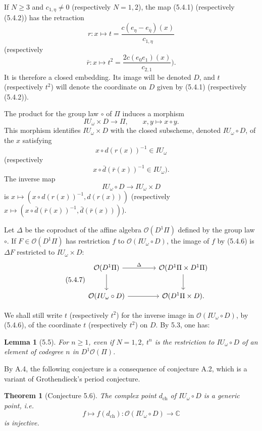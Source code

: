 \documentclass[10pt,a4paper]{article}
\newcommand{\OO}{\mathcal O}
\newcommand{\C}{\mathbb C}
\theoremstyle{deligne}
\newtheorem*{theorem*}{Theorem}
\newtheorem*{lemma*}{Lemma}
\begin{document}
If \(N\ge3\) and \(c_{1,\eta}\ne0\) (respectively \(N=1,2\)), the map (5.4.1) (respectively (5.4.2)) has the retraction
\[
r:x\longmapsto t=\frac{c(e_\eta-e_{\bar\eta})(x)}{c_{1,\eta}}
\]
(respectively
\[
\tag{5.4.3}
\bar r:x\longmapsto t^2=\frac{2c(e_0e_1)(x)}{c_{2,1}}).
\]
It is therefore a closed embedding. Its image will be denoted \(D\), and \(t\) (respectively \(t^2\)) will denote the coordinate on \(D\) given by (5.4.1) (respectively (5.4.2)).

The product for the group law \(\circ\) of \(\Pi\) induces a morphism
\[
\tag{5.4.4}
IU_\omega\times D\longrightarrow\Pi,\qquad x,y\longmapsto x\circ y.
\]
This morphism identifies \(IU_\omega\times D\) with the closed subscheme, denoted \(IU_\omega\circ D\), of the \(x\) satisfying
\[
x\circ d(r(x))^{-1}\in IU_\omega
\]
(respectively
\[
\tag{5.4.5}
x\circ\bar d(\bar r(x))^{-1}\in IU_\omega).
\]
The inverse map
\[
\tag{5.4.6}
IU_\omega\circ D\longrightarrow IU_\omega\times D
\]
is \(x\mapsto(x\circ d(r(x))^{-1},d(r(x)))\) (respectively \(x\mapsto(x\circ\bar d(\bar r(x))^{-1},\bar d(\bar r(x)))\)).

Let \(\Delta\) be the coproduct of the affine algebra \(\OO(D^1\Pi)\) defined by the group law \(\circ\). If \(F\in\OO(D^1\Pi)\) has restriction \(f\) to \(\OO(IU_\omega\circ D)\), the image of \(f\) by (5.4.6) is \(\Delta F\) restricted to \(IU_\omega\times D\):
\[
\tag{5.4.7}
\begin{tikzcd}[column sep=4.0em,row sep=2.2em]
\OO(D^1\Pi) \arrow[r,"\Delta"] \arrow[d] &
\OO(D^1\Pi\times D^1\Pi) \arrow[d]\\
\OO(IU_\omega\circ D) \arrow[r] &
\OO(D^1\Pi\times D).
\end{tikzcd}
\]

We shall still write \(t\) (respectively \(t^2\)) for the inverse image in \(\OO(IU_\omega\circ D)\), by (5.4.6), of the coordinate \(t\) (respectively \(t^2\)) on \(D\). By 5.3, one has:

\begin{lemma*}[5.5]
For \(n\ge1\), even if \(N=1,2\), \(t^n\) is the restriction to \(IU_\omega\circ D\) of an element of codegree \(n\) in \(D^1\OO(\Pi)\).
\end{lemma*}

By A.4, the following conjecture is a consequence of conjecture A.2, which is a variant of Grothendieck's period conjecture.

\begin{theorem*}[Conjecture 5.6]
The complex point \(d_{\mathrm{ch}}\) of \(IU_\omega\circ D\) is a generic point, i.e.
\[
\tag{5.6.1}
f\longmapsto f(d_{\mathrm{ch}}):\OO(IU_\omega\circ D)\longrightarrow\C
\]
is injective.
\end{theorem*}
\end{document}
